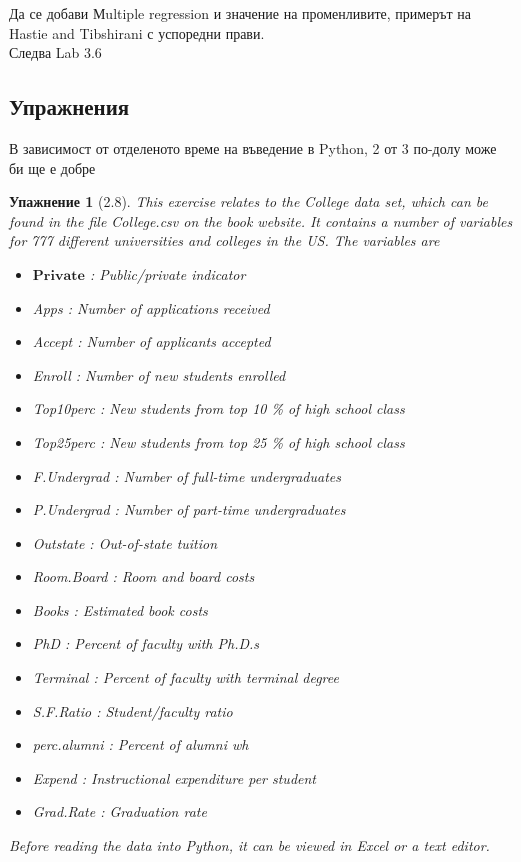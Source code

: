 \documentclass{article}
\newtheorem{exercise}[subsubsection]{Упажнение}
\begin{document}
	Да се добави Мultiple regression и значение на променливите, примерът на Hastie and Tibshirani с успоредни прави. \\
	
	Следва Lab 3.6 
	\subsection{Упражнения}
	В зависимост от отделеното време на въведение в Python,
	2 от 3 по-долу може би ще е добре
	
	\begin{exercise}[2.8]
		This exercise relates to the College data set, which can be found in
		the file College.csv on the book website. It contains a number of
		variables for 777 different universities and colleges in the US. The
		variables are
		\begin{itemize}
			\item $\mathbf{Private}$ : Public/private indicator
			\item Apps : Number of applications received
			\item Accept : Number of applicants accepted
			\item Enroll : Number of new students enrolled
			\item Top10perc : New students from top 10 \% of high school class
			\item Top25perc : New students from top 25 \% of high school class
			\item F.Undergrad : Number of full-time undergraduates
			\item P.Undergrad : Number of part-time undergraduates
			\item Outstate : Out-of-state tuition
			\item Room.Board : Room and board costs
			\item Books : Estimated book costs
			\item PhD : Percent of faculty with Ph.D.s
			\item  Terminal : Percent of faculty with terminal degree
			\item S.F.Ratio : Student/faculty ratio
			\item perc.alumni : Percent of alumni wh
			\item Expend : Instructional expenditure per student
			\item Grad.Rate : Graduation rate
		\end{itemize}
	 Before reading the data into Python, it can be viewed in Excel or a
	 text editor.
	\begin{enumerate}[label=(\alph*)]

\end{enumerate}
\end{exercise}
\end{document}
